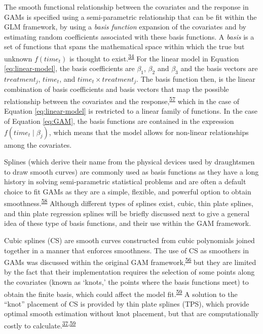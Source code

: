 \documentclass[
]{article}
\begin{document}
The smooth functional relationship between the covariates and the response in GAMs is specified using a semi-parametric relationship that can be fit within the GLM framework, by using a \emph{basis function} expansion of the covariates and by estimating random coefficients associated with these basis functions. A \emph{basis} is a set of functions that spans the mathematical space within which the true but unknown \(f(time_t)\) is thought to exist.\textsuperscript{\protect\hyperlink{ref-simpson2018}{34}} For the linear model in Equation \eqref{eq:linear-model}, the basis coefficients are \(\beta_1\), \(\beta_2\) and \(\beta_3\) and the basis vectors are \(treatment_j\), \(time_t\), and \(time_t \times treatment_j\). The basis function then, is the linear combination of basis coefficients and basis vectors that map the possible relationship between the covariates and the response,\textsuperscript{\protect\hyperlink{ref-hefley2017}{57}} which in the case of Equation \eqref{eq:linear-model} is restricted to a linear family of functions. In the case of Equation \eqref{eq:GAM}, the basis functions are contained in the expression \(f(time_t\mid \beta_j)\), which means that the model allows for non-linear relationships among the covariates.

Splines (which derive their name from the physical devices used by draughtsmen to draw smooth curves) are commonly used as basis functions as they have a long history in solving semi-parametric statistical problems and are often a default choice to fit GAMs as they are a simple, flexible, and powerful option to obtain smoothness.\textsuperscript{\protect\hyperlink{ref-wegman1983}{58}} Although different types of splines exist, cubic, thin plate splines, and thin plate regression splines will be briefly discussed next to give a general idea of these type of basis functions, and their use within the GAM framework.

Cubic splines (CS) are smooth curves constructed from cubic polynomials joined together in a manner that enforces smoothness. The use of CS as smoothers in GAMs was discussed within the original GAM framework,\textsuperscript{\protect\hyperlink{ref-hastie1987}{56}} but they are limited by the fact that their implementation requires the selection of some points along the covariates (known as `knots,' the points where the basis functions meet) to obtain the finite basis, which could affect the model fit.\textsuperscript{\protect\hyperlink{ref-wood2003}{59}} A solution to the ``knot'' placement of CS is provided by thin plate splines (TPS), which provide optimal smooth estimation without knot placement, but that are computationally costly to calculate.\textsuperscript{\protect\hyperlink{ref-wood2017}{37},\protect\hyperlink{ref-wood2003}{59}}
\end{document}
